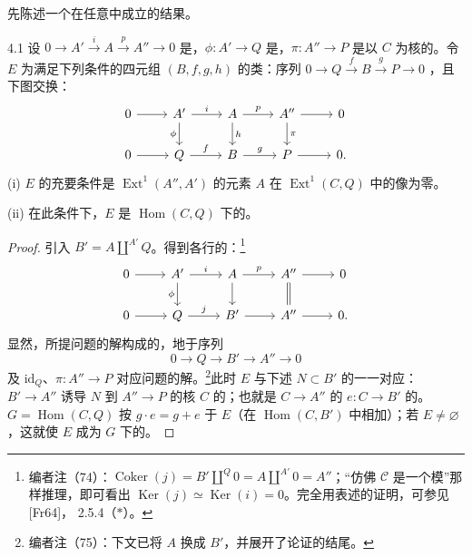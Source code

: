 先陈述一个在任意中成立的结果。
\begin{SGAresult}{}{4.1}
设 $0\to A'\xrightarrow{i}A\xrightarrow{p}A''\to0$ 是，$\phi:A'\to Q$ 是，$\pi:A''\to P$ 是以 $C$ 为核的。令 $E$ 为满足下列条件的四元组 $(B,f,g,h)$ 的类：序列 $0\to Q\xrightarrow f B\xrightarrow g P\to0$ ，且下图交换：
\[
\begin{tikzcd}
0\arrow[r]&A'\arrow[r,"i"]\arrow[d,"\phi"']&A\arrow[r,"p"]\arrow[d,"h"]&A''\arrow[r]\arrow[d,"\pi"]&0\\
0\arrow[r]&Q\arrow[r,"f"]&B\arrow[r,"g"]&P\arrow[r]&0.
\end{tikzcd}
\]
(i) $E$ 的充要条件是 $\operatorname{Ext}^1(A'',A')$ 的元素 $A$ 在 $\operatorname{Ext}^1(C,Q)$ 中的像为零。

(ii) 在此条件下，$E$ 是 $\operatorname{Hom}(C,Q)$ 下的。
\end{SGAresult}
\begin{proof}
引入 $B'=A\amalg^{A'}Q$。得到各行的：\footnote{编者注（74）：$\operatorname{Coker}(j)=B'\amalg^Q0=A\amalg^{A'}0=A''$；“仿佛 $\mathscr C$ 是一个模”那样推理，即可看出 $\operatorname{Ker}(j)\simeq\operatorname{Ker}(i)=0$。完全用表述的证明，可参见 [Fr64]， 2.5.4（$*$）。}
\[
\begin{tikzcd}
0\arrow[r]&A'\arrow[r,"i"]\arrow[d,"\phi"']&A\arrow[r,"p"]\arrow[d]&A''\arrow[r]\arrow[d,equal]&0\\
0\arrow[r]&Q\arrow[r,"j"]&B'\arrow[r]&A''\arrow[r]&0.
\end{tikzcd}
\]
显然，所提问题的解构成的，地于序列
\[0\longrightarrow Q\longrightarrow B'\longrightarrow A''\longrightarrow0\]
及 $\mathrm{id}_Q$、$\pi:A''\to P$ 对应问题的解。\footnote{编者注（75）：下文已将 $A$ 换成 $B'$，并展开了论证的结尾。}此时 $E$ 与下述 $N\subset B'$ 的一一对应：$B'\to A''$ 诱导 $N$ 到 $A''\to P$ 的核 $C$ 的；也就是 $C\to A''$ 的 $e:C\to B'$ 的。 $G=\operatorname{Hom}(C,Q)$ 按 $g\cdot e=g+e$ 于 $E$（在 $\operatorname{Hom}(C,B')$ 中相加）；若 $E\ne\varnothing$，这就使 $E$ 成为 $G$ 下的。
\end{proof}
